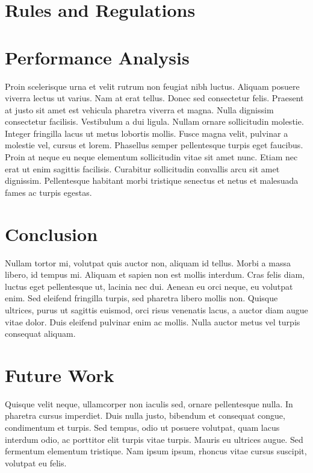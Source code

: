 \documentclass[10pt]{article}
\begin{document}
\begin{multicols}{2}
		
		\section*{Rules and Regulations}
		

		
		
		\section*{Performance Analysis}
		Proin scelerisque urna et velit rutrum non feugiat nibh luctus. Aliquam posuere viverra lectus ut varius. Nam at erat tellus. Donec sed consectetur felis. Praesent at justo sit amet est vehicula pharetra viverra et magna. Nulla dignissim consectetur facilisis. Vestibulum a dui ligula. Nullam ornare sollicitudin molestie. Integer fringilla lacus ut metus lobortis mollis. Fusce magna velit, pulvinar a molestie vel, cursus et lorem. Phasellus semper pellentesque turpis eget faucibus. Proin at neque eu neque elementum sollicitudin vitae sit amet nunc. Etiam nec erat ut enim sagittis facilisis. Curabitur sollicitudin convallis arcu sit amet dignissim. Pellentesque habitant morbi tristique senectus et netus et malesuada fames ac turpis egestas.
		
		
		\section*{Conclusion}
		Nullam tortor mi, volutpat quis auctor non, aliquam id tellus. Morbi a massa libero, id tempus mi. Aliquam et sapien non est mollis interdum. Cras felis diam, luctus eget pellentesque ut, lacinia nec dui. Aenean eu orci neque, eu volutpat enim. Sed eleifend fringilla turpis, sed pharetra libero mollis non. Quisque ultrices, purus ut sagittis euismod, orci risus venenatis lacus, a auctor diam augue vitae dolor. Duis eleifend pulvinar enim ac mollis. Nulla auctor metus vel turpis consequat aliquam.
		
		\section*{Future Work}
		Quisque velit neque, ullamcorper non iaculis sed, ornare pellentesque nulla. In pharetra cursus imperdiet. Duis nulla justo, bibendum et consequat congue, condimentum et turpis. Sed tempus, odio ut posuere volutpat, quam lacus interdum odio, ac porttitor elit turpis vitae turpis. Mauris eu ultrices augue. Sed fermentum elementum tristique. Nam ipsum ipsum, rhoncus vitae cursus suscipit, volutpat eu felis.

	\end{multicols}
\end{document}
